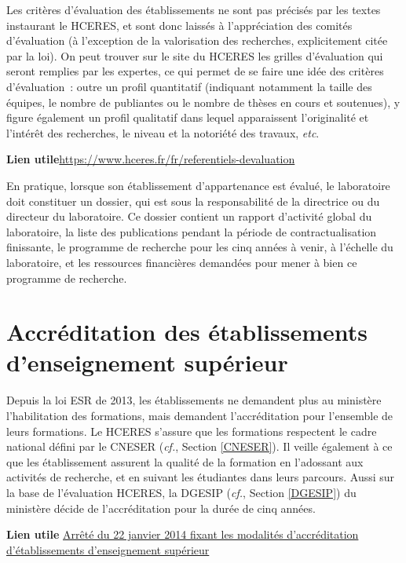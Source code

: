  Les crit\`eres d'\'evaluation des \'etablissements ne sont pas pr\'ecis\'es par les textes
instaurant le HCERES, et sont donc laiss\'es \`a l'appr\'eciation des comit\'es d'\'evaluation
 (\`a l'exception de la valorisation des recherches, explicitement cit\'ee par la loi). On
peut trouver sur le site du HCERES les grilles d'\'evaluation qui seront
remplies par les expert\mp e\mp s, ce qui permet de se faire une id\'ee des
crit\`eres d'\'evaluation~: outre un profil quantitatif (indiquant
notamment la taille des \'equipes, le nombre de publiant\mp e\mp s ou le
nombre de th\`eses en cours et soutenues), y figure \'egalement un
profil qualitatif dans lequel apparaissent l'originalit\'e et
l'int\'er\^et des recherches, le niveau et la notori\'et\'e des
travaux, {\em etc}.

\textbf{Lien utile\hspace{.5em}}\url{https://www.hceres.fr/fr/referentiels-devaluation}

En pratique, lorsque son \'etablissement d'appartenance est \'evalu\'e, le laboratoire
doit constituer un dossier, qui est sous la responsabilit\'e de la directrice ou du directeur du laboratoire.
Ce dossier contient un rapport
d'activit\'e global du laboratoire, la liste des publications pendant
la p\'eriode de contractualisation finissante, le programme de
recherche pour les cinq ann\'ees \`a venir, \`a l'\'echelle du
laboratoire, et les ressources financi\`eres demand\'ees
pour mener \`a bien ce programme de recherche.


\section{Accr\'editation des \'etablissements d'enseignement sup\'erieur}

Depuis la loi ESR de 2013, les \'etablissements ne demandent plus au minist\`ere l'habilitation des formations, 
mais demandent l'accr\'editation pour l'ensemble de leurs formations. Le HCERES s'assure que les formations respectent 
le cadre national d\'efini par le CNESER ({\em cf.}, Section \ref{CNESER}). Il veille également à ce que les \'etablissement 
assurent la qualit\'e  de la formation en l'adossant aux activit\'es de recherche, et en suivant les \'etudiant\mp e\mp s dans leurs parcours. Aussi sur la base de l'\'evaluation HCERES, la DGESIP ({\em cf.}, Section \ref{DGESIP}) du minist\`ere d\'ecide de l'accr\'editation pour la dur\'ee de cinq ann\'ees.

\textbf{Lien utile\hspace{.5em}}
\href{https://www.legifrance.gouv.fr/affichTexte.do?cidTexte=JORFTEXT000028543620&categorieLien=id}{Arrêt\'e du 22 janvier 2014 fixant les modalit\'es d'accr\'editation d'\'etablissements d'enseignement sup\'erieur}

